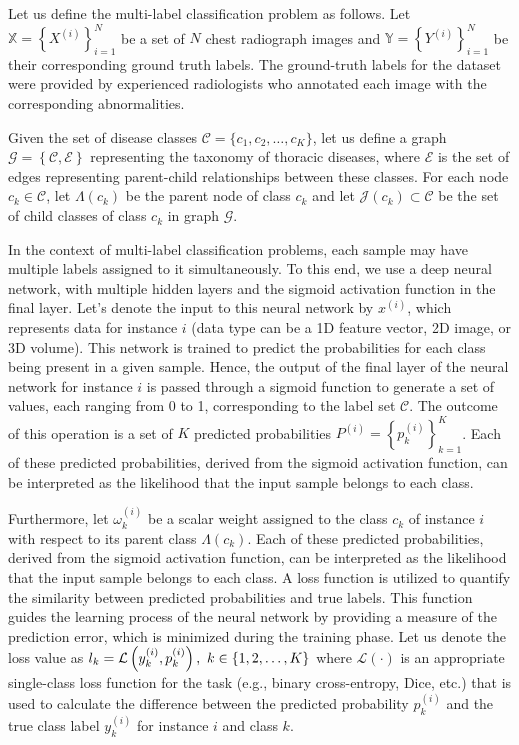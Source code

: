 \documentclass[review,1p,times,numbers]{elsarticle}
\begin{document}
%
Let us define the multi-label classification problem as follows. Let $\mathbb{X} = {\left\{X^{(i)}\right\}}_{i=1}^{N} $ be a set of $N $ chest radiograph images and $\mathbb{Y} = {\left\{Y^{(i)}\right\}}_{i=1}^{N} $ be their corresponding ground truth labels. The ground-truth labels for the dataset were provided by experienced radiologists who annotated each image with the corresponding abnormalities.

Given the set of disease classes $\mathcal{C} = \{c_1,c_2,\dots,c_K\} $, let us define a  graph $\mathcal{G}=\left\{\mathcal{C},\mathcal{E}\right\} $ representing the taxonomy of thoracic diseases, where $\mathcal{E}$ is the set of edges representing parent-child relationships between these classes. For each node $c_k \in \mathcal{C} $, let $\Lambda (c_k)$ be the parent node of class $c_k $ and let $\mathcal{J}(c_k) \subset \mathcal{C} $ be the set of child classes of class $c_k $ in graph $\mathcal{G}$.

In the context of multi-label classification problems, each sample may have multiple labels assigned to it simultaneously. To this end, we use a deep neural network, with multiple hidden layers and the sigmoid activation function in the final layer. Let's denote the input to this neural network by $x^{(i)}$, which represents data for instance $i$ (data type can be a 1D feature vector, 2D image, or 3D volume). This network is trained to predict the probabilities for each class being present in a given sample. Hence, the output of the final layer of the neural network for instance $i$ is passed through a sigmoid function to generate a set of values, each ranging from 0 to 1, corresponding to the label set $\mathcal{C} $.
The outcome of this operation is a set of $K $ predicted probabilities $P^{(i)}={\left\{p_k^{(i)}\right\}}_{k=1}^{K} $. Each of these predicted probabilities, derived from the sigmoid activation function, can be interpreted as the likelihood that the input sample belongs to each class.

Furthermore, let $\omega_k^{(i)} $ be a scalar weight assigned to the class $c_k $ of instance $i $ with respect to its parent class $\Lambda (c_k)$.
Each of these predicted probabilities, derived from the sigmoid activation function, can be interpreted as the likelihood that the input sample belongs to each class. A loss function is utilized to quantify the similarity between predicted probabilities and true labels. This function guides the learning process of the neural network by providing a measure of the prediction error, which is minimized during the training phase.
Let us denote the loss value as $l_k = \mathcal{L} \left(y_k^{(i)}, p_k^{(i)}\right),\hspace{0.33em}k \in \{1,2,\dots,K\} $ where $\mathcal{L}(\cdot) $ is an appropriate single-class loss function for the task (e.g., binary cross-entropy, Dice, etc.) that is used to calculate the difference between the predicted probability $p_k^{(i)} $ and the true class label $y_k^{(i)} $ for instance $i$ and class $k $.
\end{document}
